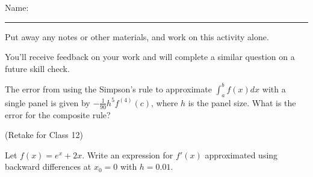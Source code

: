 \documentclass[12pt,letterpaper,noanswers]{exam}
\begin{document}
 \pdfpageheight 11in 
  \pdfpagewidth 8.5in

\noindent Name: \rule{2.5in}{0.5pt}

\noindent Put away any notes or other materials, and work on this activity alone.

\noindent You'll receive feedback on your work and will complete a similar question on a future skill check.


\begin{questions}
\item 
The error from using the Simpson's rule to approximate $\int_a^b f(x)dx$ with a single panel is given by $-\frac{1}{90}h^5f^{(4)}(c)$, where $h$ is the panel size.  What is the error for the composite rule?

\vspace{6.5cm}

\item (Retake for Class 12)

Let $f(x) = e^x+2x$.  Write an expression for $f'(x)$ approximated using backward differences at $x_0 = 0$ with $h = 0.01$.

\end{questions}
\end{document}
